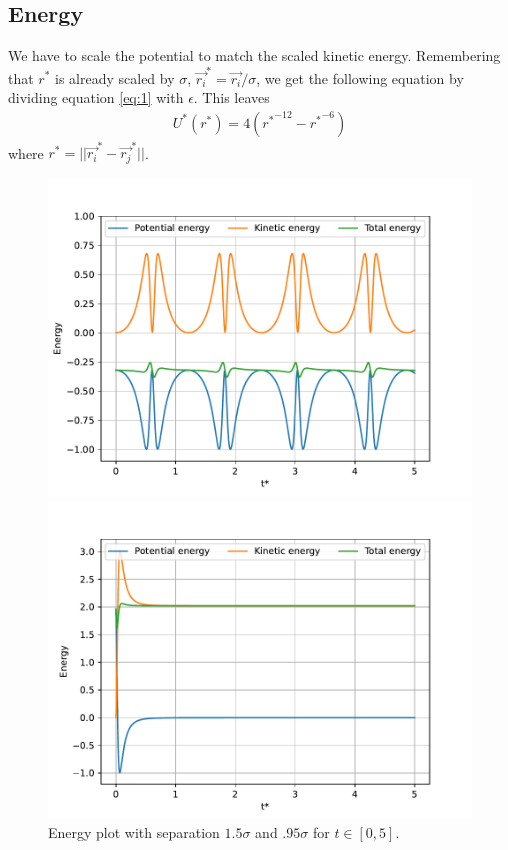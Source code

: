 \documentclass[a4paper,10pt,english]{article}
\begin{document}
\newpage

\subsection{Energy} \label{2c}

We have to scale the potential to match the scaled kinetic energy. Remembering that $r^*$ is already scaled by $\sigma$, $\Vec{r_i}^* = \Vec{r_i} / \sigma$, we get the following equation by dividing equation \ref{eq:1} with $\epsilon$. This leaves
\begin{align}
    U^*(r^*) = 4 
    \left(
        {r^*}^{-12} - {r^*}^{-6} 
    \right)
\end{align}
where $r^*=||\Vec{r_i}^* - \Vec{r_j}^*||$.

\begin{figure}[h]
    \centering
    \begin{minipage}{0.5\textwidth}
        \centering
        \includegraphics[width=1.05\textwidth]{../figures/2_c_i_1.pdf}
    \end{minipage}\hfill
    \begin{minipage}{0.5\textwidth}
        \centering
        \includegraphics[width=1.05\textwidth]{../figures/2_c_i_2.pdf}
    \end{minipage}
    \caption{Energy plot with separation $1.5\sigma$ and $.95\sigma$ for $t\in[0, 5]$.}
    \label{fig:energyplots1}
\end{figure}
\end{document}
